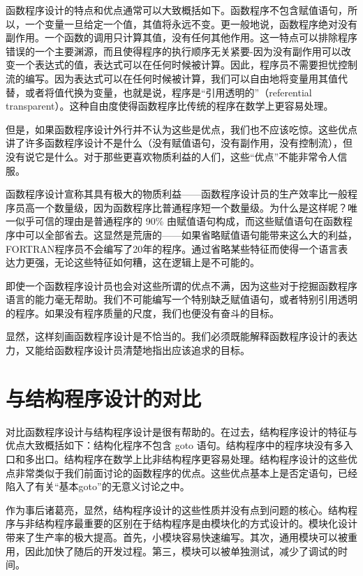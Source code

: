 \documentclass[12pt,a4paper]{article}
\begin{document}
函数程序设计的特点和优点通常可以大致概括如下。函数程序不包含赋值语句，所以，一个变量一旦给定一个值，其值将永远不变。更一般地说，函数程序绝对没有副作用。一个函数的调用只计算其值，没有任何其他作用。这一特点可以排除程序错误的一个主要渊源，而且使得程序的执行顺序无关紧要-因为没有副作用可以改变一个表达式的值，表达式可以在任何时候被计算。因此，程序员不需要担忧控制流的编写。因为表达式可以在任何时候被计算，我们可以自由地将变量用其值代替，或者将值代换为变量，也就是说，程序是``引用透明的''（referential transparent）。这种自由度使得函数程序比传统的程序在数学上更容易处理。

但是，如果函数程序设计外行并不认为这些是优点，我们也不应该吃惊。这些优点讲了许多函数程序设计不是什么（没有赋值语句，没有副作用，没有控制流），但没有说它是什么。对于那些更喜欢物质利益的人们，这些``优点''不能非常令人信服。

函数程序设计宣称其具有极大的物质利益——函数程序设计员的生产效率比一般程序员高一个数量级，因为函数程序比普通程序短一个数量级。为什么是这样呢？唯一似乎可信的理由是普通程序的 90\% 由赋值语句构成，而这些赋值语句在函数程序中可以全部省去。这显然是荒唐的——如果省略赋值语句能带来这么大的利益，FORTRAN程序员不会编写了20年的程序。通过省略某些特征而使得一个语言表达力更强，无论这些特征如何糟，这在逻辑上是不可能的。

即使一个函数程序设计员也会对这些所谓的优点不满，因为这些对于挖掘函数程序语言的能力毫无帮助。我们不可能编写一个特别缺乏赋值语句，或者特别引用透明的程序。如果没有程序质量的尺度，我们也便没有奋斗的目标。

显然，这样刻画函数程序设计是不恰当的。我们必须既能解释函数程序设计的表达力，又能给函数程序设计员清楚地指出应该追求的目标。

\section{与结构程序设计的对比}

对比函数程序设计与结构程序设计是很有帮助的。在过去，结构程序设计的特征与优点大致概括如下：结构化程序不包含 goto 语句。结构程序中的程序块没有多入口和多出口。结构程序在数学上比非结构程序更容易处理。结构程序设计的这些优点非常类似于我们前面讨论的函数程序的优点。这些优点基本上是否定语句，已经陷入了有关``基本goto''的无意义讨论之中。

作为事后诸葛亮，显然，结构程序设计的这些性质并没有点到问题的核心。结构程序与非结构程序最重要的区别在于结构程序是由模块化的方式设计的。模块化设计带来了生产率的极大提高。首先，小模块容易快速编写。其次，通用模块可以被重用，因此加快了随后的开发过程。第三，模块可以被单独测试，减少了调试的时间。
\end{document}
